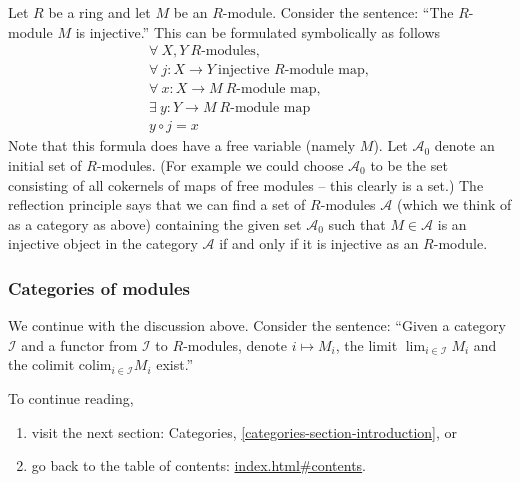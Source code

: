 \documentclass{amsart}
\theoremstyle{definition}
\theoremstyle{remark}
\numberwithin{equation}{subsection}
\begin{document}
\noindent
Let $R$ be a ring and let $M$ be an $R$-module.
Consider the sentence: ``The $R$-module $M$ is injective.''
This can be formulated symbolically as follows
\begin{eqnarray*}
\forall\ X,Y\ \text{$R$-modules},\\
\forall\ j : X\to Y\ \text{injective $R$-module map},\\
\forall\ x : X\to M\ \text{$R$-module map},\\
\exists\ y : Y\to M\ \text{$R$-module map}\\
y \circ j = x
\end{eqnarray*}
Note that this formula does have a free variable (namely $M$).
Let $\mathcal{A}_0$ denote an initial set of $R$-modules.
(For example we could choose $\mathcal{A}_0$ to be the set
consisting of all cokernels of maps of free modules -- this
clearly is a set.)
The reflection principle says that we can find a set
of $R$-modules $\mathcal{A}$ (which we think of as a category
as above) containing the given set $\mathcal{A}_0$
such that $M \in \mathcal{A}$ is an injective
object in the category $\mathcal{A}$ if and only if
it is injective as an $R$-module. 

\subsubsection{Categories of modules}

\noindent
We continue with the discussion above.
Consider the sentence: ``Given a category $\mathcal{I}$
and a functor from $\mathcal{I}$ to $R$-modules,
denote $i \mapsto M_i$, the limit $\lim_{i\in \mathcal{I}} M_i$
and the colimit $\text{colim}_{i \in \mathcal{I}} M_i$
exist.'' 


\smallskip\noindent
To continue reading, 
\begin{enumerate}

\item visit the next section: Categories,
\autoref{categories-section-introduction}, or 

\item go back to the
table of contents: \url{index.html#contents}.

\end{enumerate}




\end{document}
